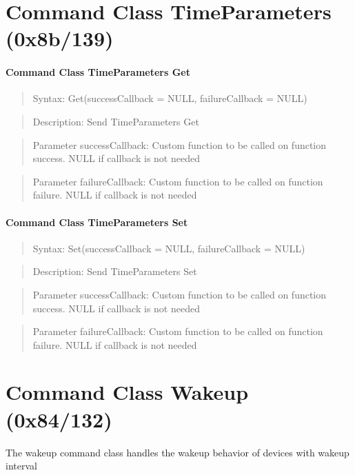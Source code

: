 \section{Command Class TimeParameters (0x8b/139)} 

\paragraph {Command Class TimeParameters Get}
\begin{quote} Syntax: Get(successCallback = NULL, failureCallback = NULL)\end{quote}
\begin{quote} Description: Send TimeParameters Get\end{quote}
\begin{quote} Parameter successCallback: Custom function to be called on function success. NULL if callback is not needed\end{quote}
\begin{quote} Parameter failureCallback: Custom function to be called on function failure. NULL if callback is not needed\end{quote}

\paragraph {Command Class TimeParameters Set}
\begin{quote} Syntax: Set(successCallback = NULL, failureCallback = NULL)\end{quote}
\begin{quote} Description: Send TimeParameters Set\end{quote}
\begin{quote} Parameter successCallback: Custom function to be called on function success. NULL if callback is not needed\end{quote}
\begin{quote} Parameter failureCallback: Custom function to be called on function failure. NULL if callback is not needed \end{quote}
 

\section{Command Class Wakeup (0x84/132)}

The wakeup command class handles the wakeup behavior of devices with wakeup interval

